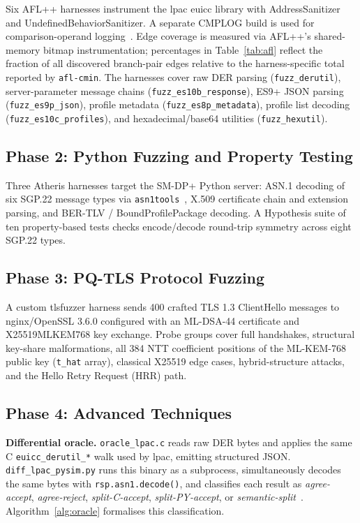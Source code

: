 \documentclass[final,3p,times,twocolumn]{elsarticle}
\begin{document}
Six AFL++ harnesses instrument the lpac euicc library with AddressSanitizer
and UndefinedBehaviorSanitizer.
A separate CMPLOG build is used for comparison-operand logging~\cite{aflpp}.
Edge coverage is measured via AFL++'s shared-memory bitmap instrumentation;
percentages in Table~\ref{tab:afl} reflect the fraction of all discovered
branch-pair edges relative to the harness-specific total reported by
\texttt{afl-cmin}.
The harnesses cover raw DER parsing (\texttt{fuzz\_derutil}), server-parameter
message chains (\texttt{fuzz\_es10b\_response}), ES9+ JSON parsing
(\texttt{fuzz\_es9p\_json}), profile metadata (\texttt{fuzz\_es8p\_metadata}),
profile list decoding (\texttt{fuzz\_es10c\_profiles}), and hexadecimal/base64
utilities (\texttt{fuzz\_hexutil}).

\subsection{Phase 2: Python Fuzzing and Property Testing}

Three Atheris harnesses target the SM-DP+ Python server: ASN.1 decoding of
six SGP.22 message types via \texttt{asn1tools}~\cite{asn1tools}, X.509
certificate chain and extension parsing, and BER-TLV / BoundProfilePackage
decoding.
A Hypothesis suite of ten property-based tests checks encode/decode
round-trip symmetry across eight SGP.22 types.

\subsection{Phase 3: PQ-TLS Protocol Fuzzing}

A custom tlsfuzzer harness sends 400 crafted TLS 1.3 ClientHello messages
to nginx/OpenSSL 3.6.0 configured with an ML-DSA-44 certificate and
X25519MLKEM768 key exchange.
Probe groups cover full handshakes, structural key-share malformations,
all 384 NTT coefficient positions of the ML-KEM-768 public key
(\texttt{t\_hat} array), classical X25519 edge cases, hybrid-structure
attacks, and the Hello Retry Request (HRR) path.

\subsection{Phase 4: Advanced Techniques}

\textbf{Differential oracle.}
\texttt{oracle\_lpac.c} reads raw DER bytes and applies the same C
\texttt{euicc\_derutil\_*} walk used by lpac, emitting structured JSON.
\texttt{diff\_lpac\_pysim.py} runs this binary as a subprocess, simultaneously
decodes the same bytes with \texttt{rsp.asn1.decode()}, and classifies each
result as \textit{agree-accept}, \textit{agree-reject}, \textit{split-C-accept},
\textit{split-PY-accept}, or \textit{semantic-split}~\cite{differential_testing}.
Algorithm~\ref{alg:oracle} formalises this classification.
\end{document}
